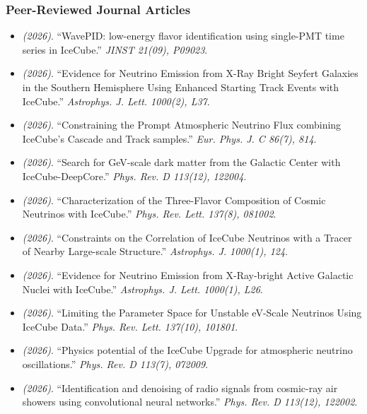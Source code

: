 \subsubsection{Peer-Reviewed Journal Articles}
\begin{itemize}
\item \textit{(2026)}. ``WavePID: low-energy flavor identification using single-PMT time series in IceCube.'' \textit{JINST 21(09), P09023}.  
\item \textit{(2026)}. ``Evidence for Neutrino Emission from X-Ray Bright Seyfert Galaxies in the Southern Hemisphere Using Enhanced Starting Track Events with IceCube.'' \textit{Astrophys. J. Lett. 1000(2), L37}.  
\item \textit{(2026)}. ``Constraining the Prompt Atmospheric Neutrino Flux combining IceCube's Cascade and Track samples.'' \textit{Eur. Phys. J. C 86(7), 814}.  
\item \textit{(2026)}. ``Search for GeV-scale dark matter from the Galactic Center with IceCube-DeepCore.'' \textit{Phys. Rev. D 113(12), 122004}.  
\item \textit{(2026)}. ``Characterization of the Three-Flavor Composition of Cosmic Neutrinos with IceCube.'' \textit{Phys. Rev. Lett. 137(8), 081002}.  
\item \textit{(2026)}. ``Constraints on the Correlation of IceCube Neutrinos with a Tracer of Nearby Large-scale Structure.'' \textit{Astrophys. J. 1000(1), 124}.  
\item \textit{(2026)}. ``Evidence for Neutrino Emission from X-Ray-bright Active Galactic Nuclei with IceCube.'' \textit{Astrophys. J. Lett. 1000(1), L26}.  
\item \textit{(2026)}. ``Limiting the Parameter Space for Unstable eV-Scale Neutrinos Using IceCube Data.'' \textit{Phys. Rev. Lett. 137(10), 101801}.  
\item \textit{(2026)}. ``Physics potential of the IceCube Upgrade for atmospheric neutrino oscillations.'' \textit{Phys. Rev. D 113(7), 072009}.  
\item \textit{(2026)}. ``Identification and denoising of radio signals from cosmic-ray air showers using convolutional neural networks.'' \textit{Phys. Rev. D 113(12), 122002}.  

\end{itemize}
